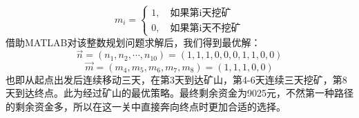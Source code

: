 \documentclass[withoutpre]{cumcmthesis} %
\begin{document}
$$m_i=\begin{cases}
1,\quad\text{如果第i天挖矿}\\
0,\quad\text{如果第i天不挖矿}
\end{cases}$$
借助MATLAB对该整数规划问题求解后，我们得到最优解：
$$\overrightarrow{n}=(n_1,n_2,\cdots,n_{10})=(1,1,1,0,0,0,1,1,0,0)$$
$$\overrightarrow{m}=(m_4,m_5,m_6,m_7,m_8)=(1,1,1,0,0)$$
也即从起点出发后连续移动三天，在第3天到达矿山，第4-6天连续三天挖矿，第8天到达终点。此为经过矿山的最优策略。最终剩余资金为9025元，不然第一种路径的剩余资金多，所以在这一关中直接奔向终点时更加合适的选择。
\begin{thebibliography}{9}%

    

\end{thebibliography}
\end{document}
